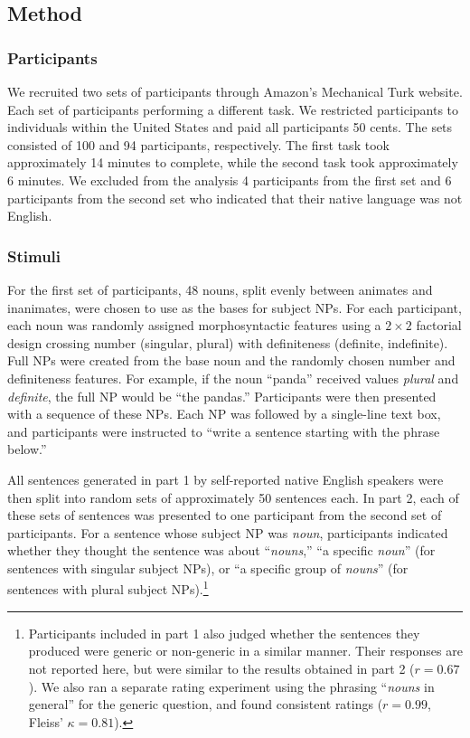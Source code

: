 \documentclass[10pt,letterpaper]{article}
\begin{document}
\subsection{Method}

\subsubsection{Participants}

We recruited two sets of participants through Amazon's Mechanical Turk website. Each set of participants performing a different task. We restricted participants to individuals within the United States and paid all participants 50 cents. The sets consisted of 100 and 94 participants, respectively. The first task took approximately 14 minutes to complete, while the second task took approximately 6 minutes. We excluded from the analysis 4 participants from the first set and 6 participants from the second set who indicated that their native language was not English.

\subsubsection{Stimuli}

For the first set of participants, 48 nouns, split evenly between animates and inanimates, were chosen to use as the bases for subject NPs. For each participant, each noun was randomly assigned morphosyntactic features using a \(2 \times 2\) factorial design crossing number (singular, plural) with definiteness (definite, indefinite). Full NPs were created from the base noun and the randomly chosen number and definiteness features. For example, if the noun ``panda'' received values \textit{plural} and \textit{definite}, the full NP would be ``the pandas.'' Participants were then presented with a sequence of these NPs. Each NP was followed by a single-line text box, and participants were instructed to ``write a sentence starting with the phrase below.''

All sentences generated in part 1 by self-reported native English speakers were then split into random sets of approximately 50 sentences each. In part 2, each of these sets of sentences was presented to one participant from the second set of participants. For a sentence whose subject NP was \textit{noun}, participants indicated whether they thought the sentence was about ``\textit{nouns},'' ``a specific \textit{noun}'' (for sentences with singular subject NPs), or ``a specific group of \textit{nouns}'' (for sentences with plural subject NPs).\footnote{Participants included in part 1 also judged whether the sentences they produced were generic or non-generic in a similar manner. Their responses are not reported here, but were similar to the results obtained in part 2 (\(r = 0.67\)). We also ran a separate rating experiment using the phrasing ``\textit{nouns} in general'' for the generic question, and found consistent ratings (\(r = 0.99\), Fleiss' \(\kappa = 0.81\)).}
\end{document}
